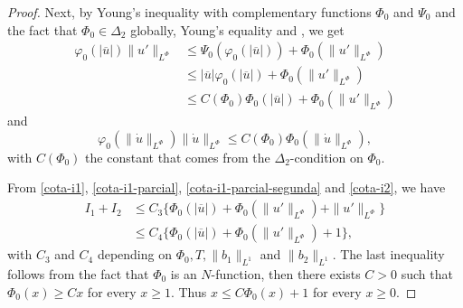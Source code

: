 \documentclass[twoside]{article}
\theoremstyle{remark}
\newcommand{\orlnor}{\|_{L^{\Phi}}}
\renewcommand{\leq}{\leqslant}
\renewcommand{\geq}{\geqslant}
\begin{document}
\begin{proof}
Next, by Young's inequality with complementary functions $\Phi_0$ and $\Psi_0$ and the fact that 
$\Phi_0 \in \Delta_2$ globally, Young's equality \cite[Eq. 2.7-2.8]{KR} and \cite[Th. 3-(ii), p. 23]{rao1991theory}, we get
\begin{equation}\label{cota-i1-parcial}
 \begin{split}
\varphi_0(|\overline{u}|) \|u'\orlnor
&\leq 
\Psi_0(\varphi_0(|\overline{u}|))+
\Phi_0(\|u'\orlnor)
\\
&\leq 
|\overline{u}|\varphi_0(|\overline{u}|)
+\Phi_0(\|u'\orlnor)
\\
&\leq C(\Phi_0)
\Phi_0(|\overline{u}|)
+\Phi_0(\|u'\orlnor)
\end{split}
\end{equation}
and 
\begin{equation}\label{cota-i1-parcial-segunda}
\varphi_0(\|\dot{u}\orlnor) \|\dot{u}\orlnor
\leq 
C(\Phi_0) \Phi_0(\|\dot{u}\orlnor),
\end{equation}
with $C(\Phi_0)$ the constant that comes from the $\Delta_2$-condition on $\Phi_0$.

From \eqref{cota-i1}, \eqref{cota-i1-parcial}, \eqref{cota-i1-parcial-segunda} and \eqref{cota-i2},
we have
\begin{equation}\label{cota-i1-i2}
\begin{split}
I_1+I_2
&
\leq C_3
\bigg\{ 
\Phi_0(|\overline{u}|)
+\Phi_0(\|u'\orlnor)
+\|u'\orlnor
\bigg\}\\
&
\leq C_4
\bigg\{ 
\Phi_0(|\overline{u}|)
+\Phi_0(\|u'\orlnor)
+1
\bigg\},
\end{split}
\end{equation}
with $C_3$ and $C_4$ depending on $\Phi_0,T, \|b_1\|_{L^1}$ and $\|b_2\|_{L^1} $. The last inequality follows from the fact that $\Phi_0$ is an $N$-function, then there exists $C>0$ such that $\Phi_0(x)\geq Cx$ for every $x\geq 1$. Thus $x\leq C\Phi_0(x)+1$ for every $x\geq 0$.



\end{proof}
\end{document}
